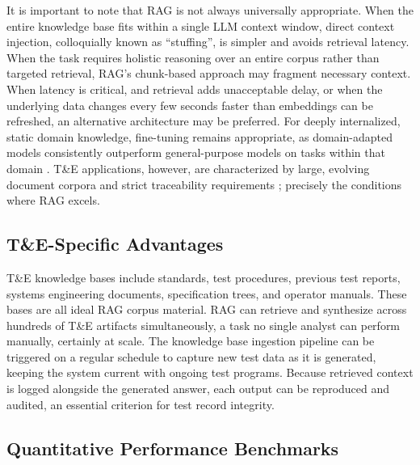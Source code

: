 \documentclass[12pt,letterpaper]{article}
\let\cite\parencite
\begin{document}
It is important to note that RAG is not always universally appropriate. When the entire knowledge base fits within a single LLM context window, direct context injection, colloquially known as ``stuffing'', is simpler and avoids retrieval latency. When the task requires holistic reasoning over an entire corpus rather than targeted retrieval, RAG's chunk-based approach may fragment necessary context. When latency is critical, and retrieval adds unacceptable delay, or when the underlying data changes every few seconds faster than embeddings can be refreshed, an alternative architecture may be preferred. For deeply internalized, static domain knowledge, fine-tuning remains appropriate, as domain-adapted models consistently outperform general-purpose models on tasks within that domain \cite{anisuzzaman2024}. T\&E applications, however, are characterized by large, evolving document corpora and strict traceability requirements \cite{kurzhals2025}; precisely the conditions where RAG excels.

\subsection{T\&E-Specific Advantages}

T\&E knowledge bases include standards, test procedures, previous test reports, systems engineering documents, specification trees, and operator manuals. These bases are all ideal RAG corpus material. RAG can retrieve and synthesize across hundreds of T\&E artifacts simultaneously, a task no single analyst can perform manually, certainly at scale. The knowledge base ingestion pipeline can be triggered on a regular schedule to capture new test data as it is generated, keeping the system current with ongoing test programs. Because retrieved context is logged alongside the generated answer, each output can be reproduced and audited, an essential criterion for test record integrity.

\subsection{Quantitative Performance Benchmarks}
\end{document}
